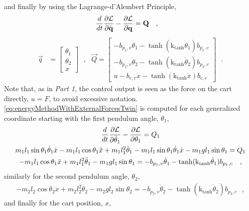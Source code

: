 and finally by using the Lagrange-d’Alembert Principle, \cite{RWisniewski}
\begin{align}
  \frac{d}{dt}  \frac{\partial \cal{L}}{\partial \dot{\vec{q}}} - \frac{\partial \cal{L}}{\partial \vec{q}}  &=  \vec{Q} \ \ \ ,
  \label{eq:energyMethodWithExternalForcesTwin}
\end{align}
\begin{align}
  \vec{q} &= 
  \begin{bmatrix}
    \theta_1    \\
    \theta_2    \\
    x
  \end{bmatrix} \ \ \ , \ \ \ 
  \vec{Q} =
  \begin{bmatrix}
    -b_{p_1,v} \dot{\theta}_1 - \tanh(\text{k}_\text{tanh}\dot{\theta}_1) b_{p_1,c}    \\
    -b_{p_2,v} \dot{\theta}_2 - \tanh(\text{k}_\text{tanh}\dot{\theta}_2) b_{p_2,c}    \\
    u - b_{c,v} \dot{x} - \tanh(\text{k}_\text{tanh}\dot{x}) b_{c,c}
  \end{bmatrix} \ \ \ .
  \label{eq:qAndQ_twin}
\end{align}
%
Note that, as in \textit{Part 1}, the control output is seen as the force on the cart directly, $u = F$, to avoid excessive notation. \autoref{eq:energyMethodWithExternalForcesTwin} is computed for each generalized coordinate starting with the first pendulum angle, $\theta_1$,
\begin{gather}
\frac{d}{dt}  \frac{\partial \cal{L}}{\partial \dot{\theta}_1} - \frac{\partial \cal{L}}{\partial \theta_1}  = Q_1 \\
m_1 l_1 \sin \theta_1 \dot{\theta}_1 \dot{x} - m_1 l_1 \cos \theta_1 \ddot{x} + m_1 l_1^2 \ddot{\theta}_1 - m_1 l_1 \sin \theta_1 \dot{\theta}_1 \dot{x} - m_1 g l_1 \sin \theta_1 = Q_1  \\
- m_1 l_1 \cos \theta_1 \ddot{x} + m_1 l_1^2 \ddot{\theta}_1 - m_1 g l_1 \sin \theta_1 = -b_{p_1,v} \dot{\theta}_1 - \tanh(\text{k}_\text{tanh}\dot{\theta}_1) b_{p_1,c}  \ \ \ ,
\label{eq:theta1Dynamics}
\end{gather}
similarly for the second pendulum angle, $\theta_2$,
\begin{gather}
- m_2 l_2 \cos \theta_2 \ddot{x} + m_2 l_2^2 \ddot{\theta}_2 - m_2 g l_2 \sin \theta_2 = -b_{p_2,v} \dot{\theta}_2 - \tanh(\text{k}_\text{tanh}\dot{\theta}_2) b_{p_2,c}  \ \ \ ,
\label{eq:theta2Dynamics}
\end{gather}
and finally for the cart position, $x$,
